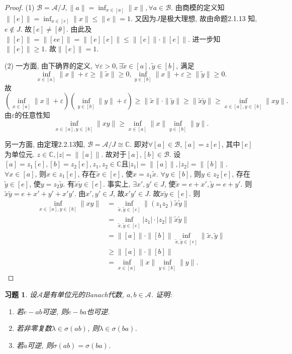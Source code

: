 \documentclass[UTF8,twoside]{ctexbook}
\newtheorem{exercise}{习题}[section]
\newcommand{\h}{\mathscr}
\newcommand{\kx}{\mathbb}
\numberwithin{equation}{section}
\begin{document}
	\begin{proof}
		(1) $\h B=\h A/J, \|a\|=\inf_{x\in [a]}\|x\|,\forall a\in \h B$. 由商模的定义知$\|[e]\|=\inf_{x\in [e]}\|x\|\leq\|e\|=1$. 又因为$J$是极大理想, 故由命题2.1.13 知, $e\notin J$. 故$[e]\neq [\theta]$. 由此及$\|[e]\|=\|[ee]\|=\|[e][e]\|\leq \|[e]\|\cdot\|[e]\|$. 进一步知$\|[e]\|\geq 1$. 故$\|[e]\|=1$.

		(2) 一方面, 由下确界的定义, $\forall \varepsilon>0, \exists \widetilde x\in [a],\widetilde y\in [b]$, 满足
		\[
		\inf_{x\in [a]}\|x\|+\varepsilon \geq \|\widetilde x\|\geq 0, \inf_{y\in [b]}\|x\|+\varepsilon \geq \|\widetilde y\|\geq 0.
		\]
		故
		\[
		(\inf_{x\in [a]}\|x\|+\varepsilon)(\inf_{y\in [b]}\|y\|+\varepsilon)\geq \|\widetilde x\|\cdot \|\widetilde y\|\geq \|\widetilde x \widetilde y\|\geq \inf_{x\in [a],y\in [b]}\|xy\|.
		\]
		由$\varepsilon$的任意性知
		\[
		\inf_{x\in[a],y\in[b]}\|xy\| \geq \inf_{x\in[a]}\|x\|\inf_{y\in[b]}\|y\|.
		\]

		另一方面, 由定理2.2.13知, $\h B=\h A/J \cong \kx C$. 即对$\forall [a]\in \h B, [a]=z[e]$, 其中$[e]$为单位元. $z\in\kx C, |z|=\|[a]\|$. 故对于$[a],[b]\in\h B$. 设$[a]=z_1[e],[b]=z_2[e],z_1,z_2\in\kx C$且$|z_1|=\|[a]\|,|z_2|=\|[b]\|$. $\forall x\in [a]$, 则$x\in z_1[e]$, 存在$\widetilde x\in [e]$, 使$x=z_1\widetilde x$. $\forall y\in [b]$, 则$y\in z_2[e]$, 存在$\widetilde y\in [e]$, 使$y=z_2\widetilde y$. 有$\widetilde x\widetilde y\in [e]$. 事实上, $\exists x',y'\in J$, 使$\widetilde x=e+x',\widetilde y=e+y'$. 则$\widetilde x\widetilde y=e+x'+y'+x'y'$. 由$x',y'\in J$, 故$x'y'\in J$. 故$\widetilde x\widetilde y\in [e]$. 则
		\[
		\begin{aligned}
		\inf_{x\in [a],y\in [b]}\|xy\|
		&=\inf_{\widetilde x,\widetilde y\in [e]}\|(z_1z_2)\widetilde x\widetilde y\|\\
		&=\inf_{\widetilde x,\widetilde y\in [e]}|z_1|\cdot |z_2|\|\widetilde x\widetilde y\|\\
		&=\|[a]\|\cdot \|[b]\|\inf_{\widetilde x,\widetilde y\in [e]}\|\widetilde x,\widetilde y\|\\
		&\geq \|[a]\|\cdot \|[b]\|\\
		&=\inf_{x\in [a]}\|x\|\inf_{y\in [b]}\|y\|.
		\end{aligned}
		\]
	\end{proof}
	\begin{exercise}
		设$\h A$是有单位元的Banach代数, $a,b\in\h A$. 证明:
		\begin{enumerate}[(1)]
			\item 若$e-ab$可逆, 则$e-ba$也可逆.
			\item 若非零复数$\lambda\in\sigma(ab)$, 则$\lambda\in\sigma(ba)$.
			\item 若$a$可逆, 则$\sigma(ab)=\sigma(ba)$.
		\end{enumerate}
	\end{exercise}
\end{document}
